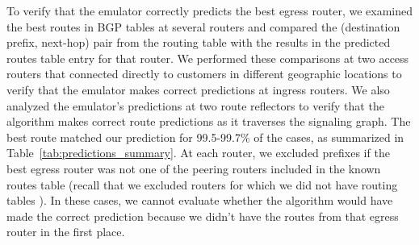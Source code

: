 To verify that the emulator correctly predicts the best egress
router, we examined the best routes in BGP tables at several routers and
compared the (destination prefix, 
next-hop) pair from the routing table with the results in the {\df
predicted routes} table entry for that router.  
We performed these comparisons at two
access routers that connected directly to
customers in different 
geographic locations
to verify that the emulator makes correct predictions at ingress
routers.  We also analyzed the emulator's predictions at two route
reflectors to verify that the algorithm makes correct route predictions
as it traverses the signaling graph.
%
The best route matched our prediction for 99.5-99.7\% of the cases, as
summarized in Table~\ref{tab:predictions_summary}.  At each router, 
we excluded prefixes if the best egress router was not one of
the peering routers included in the {\mfc known routes} table (recall
that we excluded routers for which we did not have routing tables%
). In these cases, we cannot evaluate whether the
algorithm would have made the correct prediction because we didn't
have the routes from that egress router in the first place.



